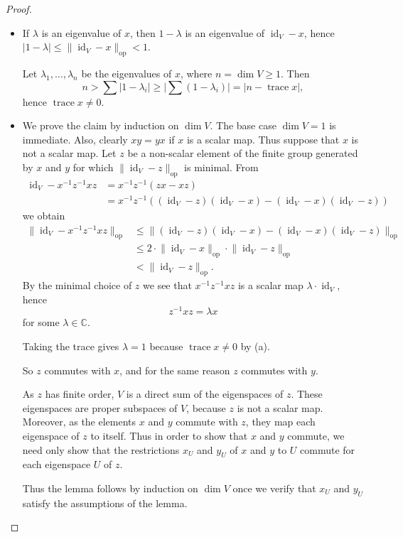 \documentclass[12pt]{amsart}
\theoremstyle{plain}
\theoremstyle{definition}
\numberwithin{equation}{section}
\newcommand*{\abs}[1]{\lvert#1\rvert}
\newcommand*{\normop}[1]{\lVert#1\rVert_\text{op}}
\newcommand*{\CC}{\mathbb C}
\DeclareMathOperator{\trace}{trace}
\DeclareMathOperator{\id}{id}
\begin{document}
\begin{proof}
  \begin{itemize}
  \item[(a)] If $\lambda$ is an eigenvalue of $x$, then $1-\lambda$ is
    an eigenvalue of $\id_V-x$, hence
    $\abs{1-\lambda}\le\normop{\id_V-x}<1$.

    Let $\lambda_1,\dots,\lambda_n$ be the eigenvalues of $x$,
    where $n=\dim V\ge1$. Then
    \[
      n %
      > \sum\abs{1-\lambda_i}%
       \ge \abs{\sum(1-\lambda_i)}%
      =\abs{n-\trace x},
    \]
    hence $\trace x\ne0$.
  \item[(b)] We prove the claim by induction on $\dim V$. The base
    case $\dim V=1$ is immediate. Also, clearly $xy=yx$ if $x$ is a
    scalar map. Thus suppose that $x$ is not a scalar map. Let $z$ be
    a non-scalar element of the finite group generated by $x$ and $y$
    for which $\normop{\id_V-z}$ is minimal. From
  \begin{align*}
    \id_V-x^{-1}z^{-1}xz%
    &=x^{-1}z^{-1}(zx-xz)\\
    &=x^{-1}z^{-1}\left((\id_V-z)(\id_V-x)-(\id_V-x)(\id_V-z)\right)
  \end{align*}
  we obtain
  \begin{align*}
    \normop{\id_V-x^{-1}z^{-1}xz}%
    &\le \normop{(\id_V-z)(\id_V-x)-(\id_V-x)(\id_V-z)}\\
    &\le2 \cdot\normop{\id_V-x}\cdot\normop{\id_V-z}\\
    &< \normop{\id_V-z}.
  \end{align*}
  By the minimal choice of $z$ we see that $x^{-1}z^{-1}xz$ is a
  scalar map $\lambda\cdot\id_V$, hence
  \[
    z^{-1}xz=\lambda x
  \]
  for some $\lambda\in\CC$.
  
  Taking the trace gives $\lambda=1$ because $\trace x\ne0$ by (a).

  So $z$ commutes with $x$, and for the same reason $z$ commutes with
  $y$.

  As $z$ has finite order, $V$ is a direct sum of the eigenspaces of
  $z$. These eigenspaces are proper subspaces of $V$, because $z$ is
  not a scalar map. Moreover, as the elements $x$ and $y$ commute with
  $z$, they map each eigenspace of $z$ to itself. Thus in order to
  show that $x$ and $y$ commute, we need only show that the
  restrictions $x_U$ and $y_U$ of $x$ and $y$ to $U$ commute for each
  eigenspace $U$ of $z$.

  Thus the lemma follows by induction on $\dim V$ once we verify that
  $x_U$ and $y_U$ satisfy the assumptions of the lemma.


\end{itemize}
\end{proof}
\end{document}
